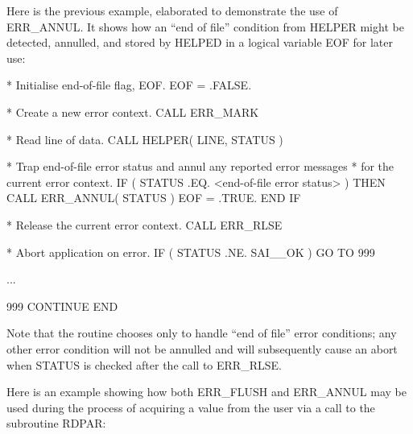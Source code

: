 \documentclass[twoside,11pt]{starlink}
\begin{document}
Here is the previous example, elaborated to demonstrate the use of ERR\_ANNUL.
It shows how an ``end of file'' condition from HELPER might be detected,
annulled, and stored by HELPED in a logical variable EOF for later use:

\begin {small}
\begin{terminalv}
*  Initialise end-of-file flag, EOF.
      EOF = .FALSE.

*  Create a new error context.
      CALL ERR_MARK

*  Read line of data.
      CALL HELPER( LINE, STATUS )

*  Trap end-of-file error status and annul any reported error messages
*  for the current error context.
      IF ( STATUS .EQ. <end-of-file error status> ) THEN
         CALL ERR_ANNUL( STATUS )
         EOF = .TRUE.
      END IF

*  Release the current error context.
      CALL ERR_RLSE

*  Abort application on error.
      IF ( STATUS .NE. SAI__OK ) GO TO 999

      ...

999   CONTINUE
      END
\end{terminalv}
\end {small}

Note that the routine chooses only to handle ``end of file'' error
conditions; any other error condition will not be annulled and will
subsequently cause an abort when STATUS is checked after the call to
ERR\_RLSE.

Here is an example showing
how both ERR\_FLUSH and ERR\_ANNUL may be used during the process of
acquiring a value from the user via a call to the subroutine RDPAR:
\end{document}
